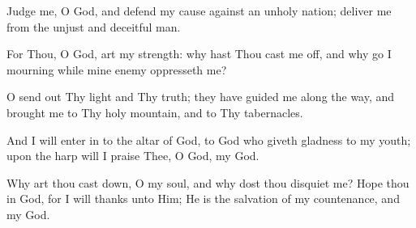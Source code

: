 Judge me, O God, and defend my cause against an unholy nation; deliver me from the unjust and deceitful man.

For Thou, O God, art my strength: why hast Thou cast me off, and why go I mourning while mine enemy oppresseth me?

O send out Thy light and Thy truth; they have guided me along the way, and brought me to Thy holy mountain, and to Thy tabernacles.

And I will enter in to the altar of God, to God who giveth gladness to my youth; upon the harp will I praise Thee, O God, my God.

Why art thou cast down, O my soul, and why dost thou disquiet me? Hope thou in God, for I will thanks unto Him; He is the salvation of my countenance, and my God.
